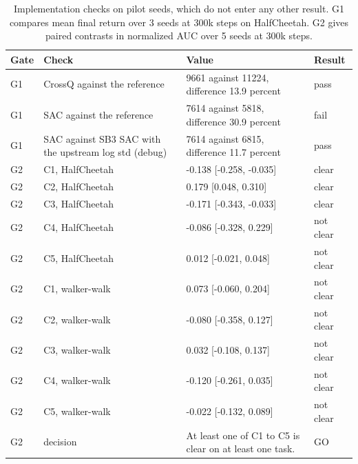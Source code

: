 \begin{table}[t]
\centering
\small
\begin{tabular}{llp{7cm}l}
\toprule
Gate & Check & Value & Result \\
\midrule
G1 & CrossQ against the reference & 9661 against 11224, difference 13.9 percent & pass \\
G1 & SAC against the reference & 7614 against 5818, difference 30.9 percent & fail \\
G1 & SAC against SB3 SAC with the upstream log std (debug) & 7614 against 6815, difference 11.7 percent & pass \\
G2 & C1, HalfCheetah & -0.138 [-0.258, -0.035] & clear \\
G2 & C2, HalfCheetah & 0.179 [0.048, 0.310] & clear \\
G2 & C3, HalfCheetah & -0.171 [-0.343, -0.033] & clear \\
G2 & C4, HalfCheetah & -0.086 [-0.328, 0.229] & not clear \\
G2 & C5, HalfCheetah & 0.012 [-0.021, 0.048] & not clear \\
G2 & C1, walker-walk & 0.073 [-0.060, 0.204] & not clear \\
G2 & C2, walker-walk & -0.080 [-0.358, 0.127] & not clear \\
G2 & C3, walker-walk & 0.032 [-0.108, 0.137] & not clear \\
G2 & C4, walker-walk & -0.120 [-0.261, 0.035] & not clear \\
G2 & C5, walker-walk & -0.022 [-0.132, 0.089] & not clear \\
G2 & decision & At least one of C1 to C5 is clear on at least one task. & GO \\
\bottomrule
\end{tabular}
\caption{Implementation checks on pilot seeds, which do not enter any other result. G1 compares mean final return over 3 seeds at 300k steps on HalfCheetah. G2 gives paired contrasts in normalized AUC over 5 seeds at 300k steps.}
\label{tab:gates}
\end{table}
